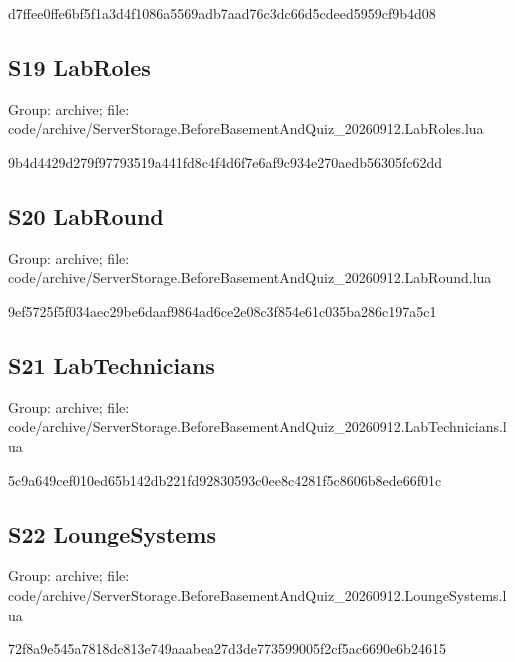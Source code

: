 \begin{flushleft}\ttfamily\footnotesize d7ffee0ffe6bf5f1a3d4f1086a5569adb7aad76c3dc66d5cdeed5959cf9b4d08\end{flushleft}
\subsection{S19 LabRoles}
Group: archive; file: code/\allowbreak{}archive/\allowbreak{}ServerStorage.\allowbreak{}BeforeBasementAndQuiz\_\allowbreak{}20260912.\allowbreak{}LabRoles.\allowbreak{}lua

\begin{flushleft}\ttfamily\footnotesize 9b4d4429d279f97793519a441fd8c4f4d6f7e6af9c934e270aedb56305fc62dd\end{flushleft}
\subsection{S20 LabRound}
Group: archive; file: code/\allowbreak{}archive/\allowbreak{}ServerStorage.\allowbreak{}BeforeBasementAndQuiz\_\allowbreak{}20260912.\allowbreak{}LabRound.\allowbreak{}lua

\begin{flushleft}\ttfamily\footnotesize 9ef5725f5f034aec29be6daaf9864ad6ce2e08c3f854e61c035ba286c197a5c1\end{flushleft}
\subsection{S21 LabTechnicians}
Group: archive; file: code/\allowbreak{}archive/\allowbreak{}ServerStorage.\allowbreak{}BeforeBasementAndQuiz\_\allowbreak{}20260912.\allowbreak{}LabTechnicians.\allowbreak{}lua

\begin{flushleft}\ttfamily\footnotesize 5c9a649cef010ed65b142db221fd92830593c0ee8c4281f5c8606b8ede66f01c\end{flushleft}
\subsection{S22 LoungeSystems}
Group: archive; file: code/\allowbreak{}archive/\allowbreak{}ServerStorage.\allowbreak{}BeforeBasementAndQuiz\_\allowbreak{}20260912.\allowbreak{}LoungeSystems.\allowbreak{}lua

\begin{flushleft}\ttfamily\footnotesize 72f8a9e545a7818dc813e749aaabea27d3de773599005f2cf5ac6690e6b24615\end{flushleft}
